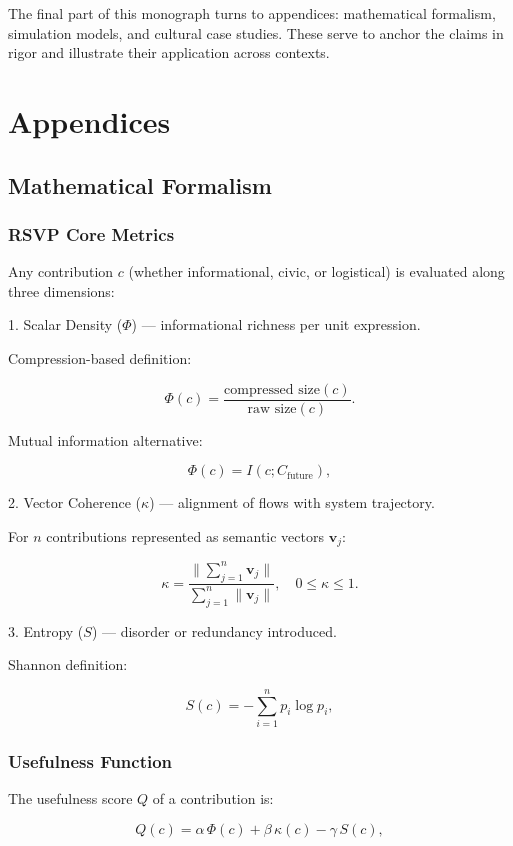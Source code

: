 \documentclass{book}
\begin{document}
The final part of this monograph turns to appendices: mathematical formalism, simulation models, and cultural case studies. These serve to anchor the claims in rigor and illustrate their application across contexts.

\part{Appendices}

\appendix
\chapter{Mathematical Formalism}

\section{RSVP Core Metrics}

Any contribution \( c \) (whether informational, civic, or logistical) is evaluated along three dimensions:

1. Scalar Density (\(\Phi\)) — informational richness per unit expression.

Compression-based definition:

\[ \Phi(c) = \frac{\text{compressed size}(c)}{\text{raw size}(c)}. \]

Mutual information alternative:

\[ \Phi(c) = I(c; C_{\text{future}}), \]

2. Vector Coherence (\(\kappa\)) — alignment of flows with system trajectory.

For \( n \) contributions represented as semantic vectors \( \mathbf{v}_j \):

\[ \kappa = \frac{\|\sum_{j=1}^n \mathbf{v}_j\|}{\sum_{j=1}^n \|\mathbf{v}_j\|}, \quad 0 \leq \kappa \leq 1. \]

3. Entropy (\( S \)) — disorder or redundancy introduced.

Shannon definition:

\[ S(c) = -\sum_{i=1}^n p_i \log p_i, \]

\section{Usefulness Function}

The usefulness score \( Q \) of a contribution is:

\[ Q(c) = \alpha \, \Phi(c) + \beta \, \kappa(c) - \gamma \, S(c), \]
\end{document}
